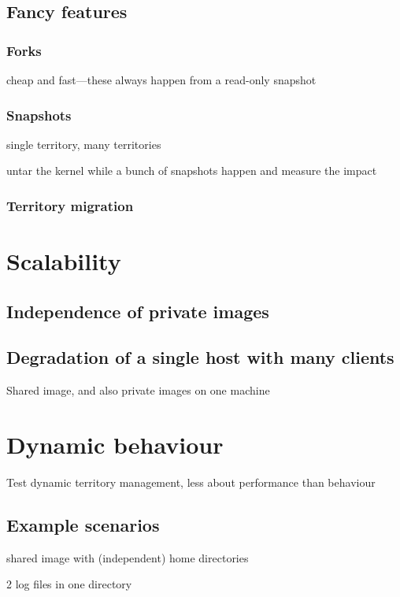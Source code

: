 \subsection{Fancy features}
\subsubsection{Forks}

cheap and fast---these always happen from a read-only snapshot

\subsubsection{Snapshots}

single territory, many territories

untar the kernel while a bunch of snapshots happen and measure the impact

\subsubsection{Territory migration}

\section{Scalability}
\subsection{Independence of private images}
\subsection{Degradation of a single host with many clients}
Shared image, and also private images on one machine

\section{Dynamic behaviour}

Test dynamic territory management, less about performance than behaviour

\subsection{Example scenarios}

shared image with (independent) home directories

2 log files in one directory

